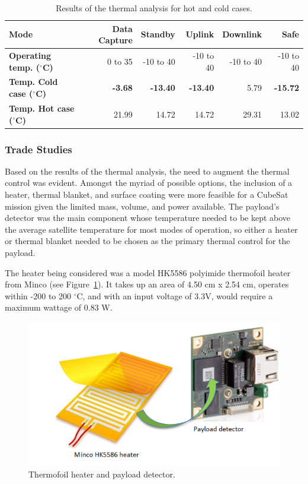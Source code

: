 \documentclass[12pt]{article}
\begin{document}
\begin{table}[ht]%
\caption{Results of the thermal analysis for hot and cold cases.}
\label{table:thermal-results}
\begin{tabular}{|l|r|r|r|r|r|}\hline
\textbf{Mode} & \textbf{Data Capture} & \textbf{Standby} & \textbf{Uplink} & \textbf{Downlink} & \textbf{Safe} \\\hline
\textbf{Operating temp. ($^\circ$C)} & 0 to 35 & -10 to 40 & -10 to 40 & -10 to 40 & -10 to 40 \\\hline
\textbf{Temp. Cold case ($^\circ$C)} & \textbf{-3.68} & \textbf{-13.40} & \textbf{-13.40} & 5.79 & \textbf{-15.72} \\\hline
\textbf{Temp. Hot case ($^\circ$C)} & 21.99 & 14.72 & 14.72 & 29.31 & 13.02 \\\hline
\end{tabular}
\end{table}

\subsubsection{Trade Studies}

Based on the results of the thermal analysis, the need to augment the thermal control was evident. Amongst the myriad of possible options, the inclusion of a heater, thermal blanket, and surface coating were more feasible for a CubeSat mission given the limited mass, volume, and power available. The payload’s detector was the main component whose temperature needed to be kept above the average satellite temperature for most modes of operation, so either a heater or thermal blanket needed to be chosen as the primary thermal control for the payload.

The heater being considered was a model HK5586 polyimide thermofoil heater from Minco (see Figure~\ref{fig:thermal-heater}). It takes up an area of 4.50 cm x 2.54 cm, operates within -200 to 200 $^\circ$C, and with an input voltage of 3.3V, would require a maximum wattage of 0.83 W. 

\begin{figure}[ht]%
\centering
\includegraphics{images/thermal-heater}%
\caption{Thermofoil heater and payload detector.\cite{minco,ids-imaging}}%
\label{fig:thermal-heater}%
\end{figure}
\end{document}
